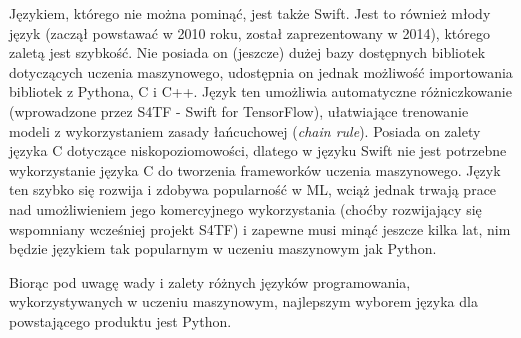 \documentclass[polish,12pt]{aghthesis}
\begin{document}
Językiem, którego nie można pominąć, jest także Swift. Jest to również młody język (zaczął powstawać w 2010 roku, został zaprezentowany w 2014), którego zaletą jest szybkość. Nie posiada on (jeszcze) dużej bazy dostępnych bibliotek dotyczących uczenia maszynowego, udostępnia on jednak możliwość importowania bibliotek z Pythona, C i C++. Język ten umożliwia automatyczne różniczkowanie (wprowadzone przez S4TF - Swift for TensorFlow), ułatwiające trenowanie modeli z wykorzystaniem zasady łańcuchowej (\textit{chain rule}). Posiada on zalety języka C dotyczące niskopoziomowości, dlatego w języku Swift nie jest potrzebne wykorzystanie języka C do tworzenia frameworków uczenia maszynowego. Język ten szybko się rozwija i zdobywa popularność w ML, wciąż jednak trwają prace nad umożliwieniem jego komercyjnego wykorzystania (choćby rozwijający się wspomniany wcześniej projekt S4TF) i zapewne musi minąć jeszcze kilka lat, nim będzie językiem tak popularnym w uczeniu maszynowym jak Python.
\par
Biorąc pod uwagę wady i zalety różnych języków programowania, wykorzystywanych w uczeniu maszynowym, najlepszym wyborem języka dla powstającego produktu jest Python.
\end{document}
